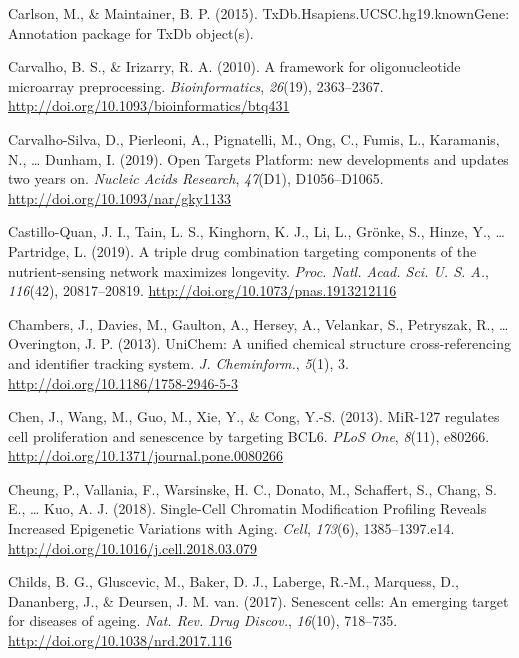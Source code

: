 \documentclass[12pt,twoside]{unicam}
\begin{document}
\begin{cslreferences}
\leavevmode\hypertarget{ref-Carlson2015}{}%
Carlson, M., \& Maintainer, B. P. (2015). TxDb.Hsapiens.UCSC.hg19.knownGene: Annotation package for TxDb object(s).

\leavevmode\hypertarget{ref-Carvalho2010}{}%
Carvalho, B. S., \& Irizarry, R. A. (2010). A framework for oligonucleotide microarray preprocessing. \emph{Bioinformatics}, \emph{26}(19), 2363--2367. \url{http://doi.org/10.1093/bioinformatics/btq431}

\leavevmode\hypertarget{ref-Carvalho-Silva2019}{}%
Carvalho-Silva, D., Pierleoni, A., Pignatelli, M., Ong, C., Fumis, L., Karamanis, N., \ldots{} Dunham, I. (2019). Open Targets Platform: new developments and updates two years on. \emph{Nucleic Acids Research}, \emph{47}(D1), D1056--D1065. \url{http://doi.org/10.1093/nar/gky1133}

\leavevmode\hypertarget{ref-Castillo-Quan2019}{}%
Castillo-Quan, J. I., Tain, L. S., Kinghorn, K. J., Li, L., Grönke, S., Hinze, Y., \ldots{} Partridge, L. (2019). A triple drug combination targeting components of the nutrient-sensing network maximizes longevity. \emph{Proc. Natl. Acad. Sci. U. S. A.}, \emph{116}(42), 20817--20819. \url{http://doi.org/10.1073/pnas.1913212116}

\leavevmode\hypertarget{ref-Chambers2013}{}%
Chambers, J., Davies, M., Gaulton, A., Hersey, A., Velankar, S., Petryszak, R., \ldots{} Overington, J. P. (2013). UniChem: A unified chemical structure cross-referencing and identifier tracking system. \emph{J. Cheminform.}, \emph{5}(1), 3. \url{http://doi.org/10.1186/1758-2946-5-3}

\leavevmode\hypertarget{ref-Chen2013}{}%
Chen, J., Wang, M., Guo, M., Xie, Y., \& Cong, Y.-S. (2013). MiR-127 regulates cell proliferation and senescence by targeting BCL6. \emph{PLoS One}, \emph{8}(11), e80266. \url{http://doi.org/10.1371/journal.pone.0080266}

\leavevmode\hypertarget{ref-Cheung2018}{}%
Cheung, P., Vallania, F., Warsinske, H. C., Donato, M., Schaffert, S., Chang, S. E., \ldots{} Kuo, A. J. (2018). Single-Cell Chromatin Modification Profiling Reveals Increased Epigenetic Variations with Aging. \emph{Cell}, \emph{173}(6), 1385--1397.e14. \url{http://doi.org/10.1016/j.cell.2018.03.079}

\leavevmode\hypertarget{ref-Childs2017}{}%
Childs, B. G., Gluscevic, M., Baker, D. J., Laberge, R.-M., Marquess, D., Dananberg, J., \& Deursen, J. M. van. (2017). Senescent cells: An emerging target for diseases of ageing. \emph{Nat. Rev. Drug Discov.}, \emph{16}(10), 718--735. \url{http://doi.org/10.1038/nrd.2017.116}


\end{cslreferences}
\end{document}
